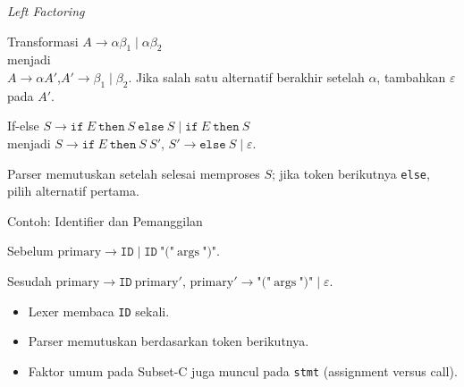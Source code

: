 \documentclass[aspectratio=169,10pt,t]{beamer}
\begin{document}
\begin{frame}{\textit{Left Factoring}}
  \begin{block}{Transformasi}
    \small
    \(A \to \alpha\beta_1 \mid \alpha\beta_2\)\\
    menjadi\\
    \(A \to \alpha A'\),\qquad \(A' \to \beta_1 \mid \beta_2\).
    Jika salah satu alternatif berakhir setelah \(\alpha\), tambahkan
    \(\varepsilon\) pada \(A'\).
  \end{block}

  \begin{exampleblock}{If-else}
    \footnotesize
    \(S \to \texttt{if}\ E\ \texttt{then}\ S\ \texttt{else}\ S
     \mid \texttt{if}\ E\ \texttt{then}\ S\)\\
    menjadi
    \(S \to \texttt{if}\ E\ \texttt{then}\ S\ S'\),
    \(S' \to \texttt{else}\ S \mid \varepsilon\).
  \end{exampleblock}

  \vspace{2pt}
  {\footnotesize Parser memutuskan setelah selesai memproses \(S\);
  jika token berikutnya \texttt{else}, pilih alternatif pertama.}
\end{frame}

\begin{frame}[fragile]{Contoh: Identifier dan Pemanggilan}
  \begin{block}{Sebelum}
    \small
    \(\text{primary} \to \texttt{ID} \mid \texttt{ID}\
    \texttt{"("}\ \text{args}\ \texttt{")"}\).
  \end{block}

  \begin{block}{Sesudah}
    \small
    \(\text{primary} \to \texttt{ID}\ \text{primary}'\),\quad
    \(\text{primary}' \to \texttt{"("}\ \text{args}\
    \texttt{")"} \mid \varepsilon\).
  \end{block}

  \vspace{3pt}
  \begin{itemize}
    \item Lexer membaca \texttt{ID} sekali.
    \item Parser memutuskan berdasarkan token berikutnya.
    \item Faktor umum pada Subset-C juga muncul pada \texttt{stmt}
          (assignment versus call).
  \end{itemize}
\end{frame}
\end{document}
